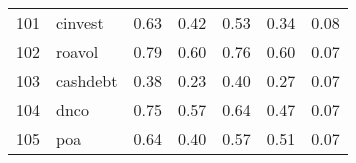 \documentclass[12pt]{article}
\begin{document}
\begin{footnotesize}
\begin{longtable}{rl|c|c|c|c|c}
				101                  & cinvest                     & 0.63                             & 0.42                                                                                          & 0.53                                                                                          & 0.34                                                                                          & 0.08                                                                                                   \\
				102                  & roavol                      & 0.79                             & 0.60                                                                                          & 0.76                                                                                          & 0.60                                                                                          & 0.07                                                                                                   \\
				103                  & cashdebt                    & 0.38                             & 0.23                                                                                          & 0.40                                                                                          & 0.27                                                                                          & 0.07                                                                                                   \\
				104                  & dnco                        & 0.75                             & 0.57                                                                                          & 0.64                                                                                          & 0.47                                                                                          & 0.07                                                                                                   \\
				105                  & poa                         & 0.64                             & 0.40                                                                                          & 0.57                                                                                          & 0.51                                                                                          & 0.07                                                                                                   \\

\end{longtable}
\end{footnotesize}
\end{document}
